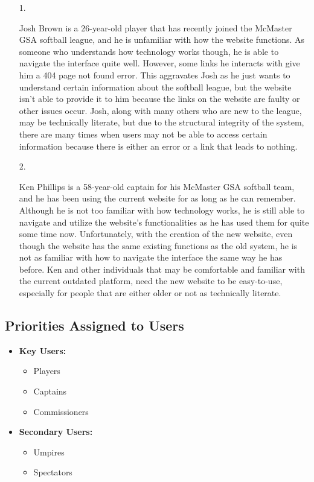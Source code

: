\documentclass[12pt]{article}
\begin{document}
\begin{itemize}
  \item [1.]
  
  Josh Brown is a 26-year-old player that has recently joined the McMaster GSA
  softball league, and he is unfamiliar with how the website functions. As someone
  who understands how technology works though, he is able to navigate the interface
  quite well. However, some links he interacts with give him a 404 page not found
  error. This aggravates Josh as he just wants to understand certain information
  about the softball league, but the website isn't able to provide it to him
  because the links on the website are faulty or other issues occur. Josh, along
  with many others who are new to the league, may be technically literate, but due
  to the structural integrity of the system, there are many times when users may
  not be able to access certain information because there is either an error or a
  link that leads to nothing.
  \item [2.]
  
  Ken Phillips is a 58-year-old captain for his McMaster GSA softball team, and he has
  been using the current website for as long as he can remember. Although he is not
  too familiar with how technology works, he is still able to navigate and utilize the
  website's functionalities as he has used them for quite some time now. Unfortunately,
  with the creation of the new website, even though the website has the same existing
  functions as the old system, he is not as familiar with how to navigate the interface
  the same way he has before. Ken and other individuals that may be comfortable and
  familiar with the current outdated platform, need the new website to be easy-to-use,
  especially for people that are either older or not as technically literate.
\end{itemize}

\subsection{Priorities Assigned to Users}

\begin{itemize}
  \item \textbf{Key Users:}
  \begin{itemize}
    \item Players
    \item Captains
    \item Commissioners
  \end{itemize}
  \item \textbf{Secondary Users:}
  \begin{itemize}
    \item Umpires
    \item Spectators
  \end{itemize}
\end{itemize}
\end{document}
